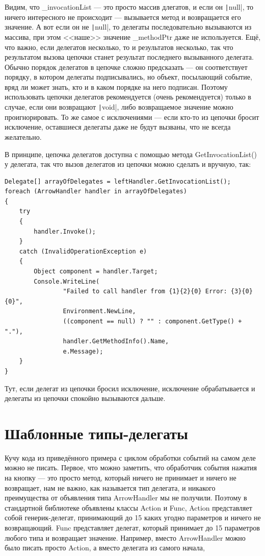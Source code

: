 \documentclass{../../text-style}
\begin{document}
Видим, что \_invocationList --- это просто массив длегатов, и если он \texttt|null|, то ничего интересного не происходит --- вызывается метод и возвращается его значение. А вот если он не \texttt|null|, то делегаты последовательно вызываются из массива, при этом <<наше>> значение \_methodPtr даже не используется. Ещё, что важно, если делегатов несколько, то и результатов несколько, так что результатом вызова цепочки станет результат последнего вызыванного делегата. Обычно порядок делегатов в цепочке сложно предсказать --- он соответствует порядку, в котором делегаты подписывались, но объект, посылающий событие, вряд ли может знать, кто и в каком порядке на него подписан. Поэтому использовать цепочки делегатов рекомендуется (очень рекомендуется) только в случае, если они возвращают \texttt|void|, либо возвращаемое значение можно проигнорировать. То же самое с исключениями --- если кто-то из цепочки бросит исключение, оставшиеся делегаты даже не будут вызваны, что не всегда желательно.

В принципе, цепочка делегатов доступна с помощью метода GetInvocationList() у делегата, так что вызов делегатов из цепочки можно сделать и вручную, так:

\begin{verbatim}
Delegate[] arrayOfDelegates = leftHandler.GetInvocationList();
foreach (ArrowHandler handler in arrayOfDelegates) 
{
    try 
    {
        handler.Invoke();
    }
    catch (InvalidOperationException e) 
    {
        Object component = handler.Target;
        Console.WriteLine(
                "Failed to call handler from {1}{2}{0} Error: {3}{0}{0}",
                Environment.NewLine,
                ((component == null) ? "" : component.GetType() + "."),
                handler.GetMethodInfo().Name,
                e.Message);
    }
}
\end{verbatim}

Тут, если делегат из цепочки бросил исключение, исключение обрабатывается и делегаты из цепочки спокойно вызываются дальше.

\section{Шаблонные типы-делегаты}

Кучу кода из приведённого примера с циклом обработки событий на самом деле можно не писать. Первое, что можно заметить, что обработчик события нажатия на кнопку --- это просто метод, который ничего не принимает и ничего не возвращает, нам не важно, как называется тип делегата, и никакого преимущества от объявления типа ArrowHandler мы не получили. Поэтому в стандартной библиотеке объявлены классы Action и Func, Action представляет собой генерик-делегат, принимающий до 15 каких угодно параметров и ничего не возвращающий. Func представляет делегат, который принимает до 15 параметров любого типа и возвращает значение. Например, вместо ArrowHandler можно было писать просто Action, а вместо делегата из самого начала, 
\end{document}
